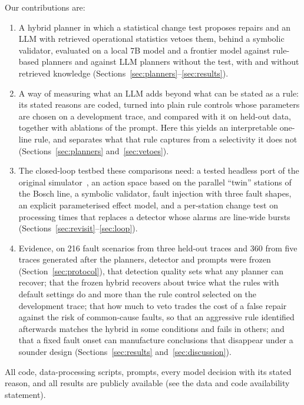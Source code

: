 \documentclass[preprint,11pt]{elsarticle}
\begin{document}
Our contributions are:
\begin{enumerate}
  \item A hybrid planner in which a statistical change test proposes repairs and an LLM with retrieved operational statistics vetoes them, behind a symbolic validator, evaluated on a local 7B model and a frontier model against rule-based planners and against LLM planners without the test, with and without retrieved knowledge (Sections~\ref{sec:planners}--\ref{sec:results}).
  \item A way of measuring what an LLM adds beyond what can be stated as a rule: its stated reasons are coded, turned into plain rule controls whose parameters are chosen on a development trace, and compared with it on held-out data, together with ablations of the prompt. Here this yields an interpretable one-line rule, and separates what that rule captures from a selectivity it does not (Sections~\ref{sec:planners} and~\ref{sec:vetoes}).
  \item The closed-loop testbed these comparisons need: a tested headless port of the original simulator~\cite{sanchez2020selfstar}, an action space based on the parallel ``twin'' stations of the Bosch line, a symbolic validator, fault injection with three fault shapes, an explicit parameterised effect model, and a per-station change test on processing times that replaces a detector whose alarms are line-wide bursts (Sections~\ref{sec:revisit}--\ref{sec:loop}).
  \item Evidence, on 216 fault scenarios from three held-out traces and 360 from five traces generated after the planners, detector and prompts were frozen (Section~\ref{sec:protocol}), that detection quality sets what any planner can recover; that the frozen hybrid recovers about twice what the rules with default settings do and more than the rule control selected on the development trace; that how much to veto trades the cost of a false repair against the risk of common-cause faults, so that an aggressive rule identified afterwards matches the hybrid in some conditions and fails in others; and that a fixed fault onset can manufacture conclusions that disappear under a sounder design (Sections~\ref{sec:results} and~\ref{sec:discussion}).
\end{enumerate}

All code, data-processing scripts, prompts, every model decision with its stated reason, and all results are publicly available (see the data and code availability statement).

\end{document}
